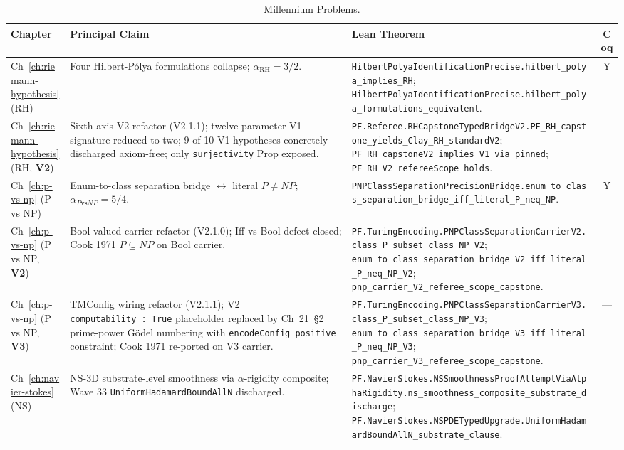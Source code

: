 \begin{table}[h]
\centering
\footnotesize
\caption{Millennium Problems.}
\begin{tabular}{p{1.7cm}p{4.2cm}p{5.6cm}c}
\toprule
\textbf{Chapter} & \textbf{Principal Claim} & \textbf{Lean Theorem} & \textbf{Coq} \\
\midrule
Ch~\ref{ch:riemann-hypothesis} (RH)
& Four Hilbert-P\'olya formulations collapse; $\alpha_{\text{RH}} = 3/2$.
& \texttt{HilbertPolyaIdentificationPrecise.hilbert\_polya\_implies\_RH}; \texttt{HilbertPolyaIdentificationPrecise.hilbert\_polya\_formulations\_equivalent}.
& Y \\
Ch~\ref{ch:riemann-hypothesis} (RH, \textbf{V2})
& Sixth-axis V2 refactor (V2.1.1); twelve-parameter V1 signature reduced to two; 9 of 10 V1 hypotheses concretely discharged axiom-free; only \texttt{surjectivity} Prop exposed.
& \texttt{PF.Referee.RHCapstoneTypedBridgeV2.PF\_RH\_capstone\_yields\_Clay\_RH\_standardV2}; \texttt{PF\_RH\_capstoneV2\_implies\_V1\_via\_pinned}; \texttt{PF\_RH\_V2\_refereeScope\_holds}.
& --- \\
Ch~\ref{ch:p-vs-np} (P vs NP)
& Enum-to-class separation bridge $\leftrightarrow$ literal $P \ne NP$; $\alpha_{P\text{vs}NP} = 5/4$.
& \texttt{PNPClassSeparationPrecisionBridge.enum\_to\_class\_separation\_bridge\_iff\_literal\_P\_neq\_NP}.
& Y \\
Ch~\ref{ch:p-vs-np} (P vs NP, \textbf{V2})
& Bool-valued carrier refactor (V2.1.0); Iff-vs-Bool defect closed; Cook 1971 $P \subseteq NP$ on Bool carrier.
& \texttt{PF.TuringEncoding.PNPClassSeparationCarrierV2.class\_P\_subset\_class\_NP\_V2}; \texttt{enum\_to\_class\_separation\_bridge\_V2\_iff\_literal\_P\_neq\_NP\_V2}; \texttt{pnp\_carrier\_V2\_referee\_scope\_capstone}.
& --- \\
Ch~\ref{ch:p-vs-np} (P vs NP, \textbf{V3})
& TMConfig wiring refactor (V2.1.1); V2 \texttt{computability~:~True} placeholder replaced by Ch~21~\S2 prime-power G\"odel numbering with \texttt{encodeConfig\_positive} constraint; Cook 1971 re-ported on V3 carrier.
& \texttt{PF.TuringEncoding.PNPClassSeparationCarrierV3.class\_P\_subset\_class\_NP\_V3}; \texttt{enum\_to\_class\_separation\_bridge\_V3\_iff\_literal\_P\_neq\_NP\_V3}; \texttt{pnp\_carrier\_V3\_referee\_scope\_capstone}.
& --- \\
Ch~\ref{ch:navier-stokes} (NS)
& NS-3D substrate-level smoothness via $\alpha$-rigidity composite; Wave 33 \texttt{UniformHadamardBoundAllN} discharged.
& \texttt{PF.NavierStokes.NSSmoothnessProofAttemptViaAlphaRigidity.ns\_smoothness\_composite\_substrate\_discharge}; \texttt{PF.NavierStokes.NSPDETypedUpgrade.UniformHadamardBoundAllN\_substrate\_clause}.

\end{tabular}
\end{table}
